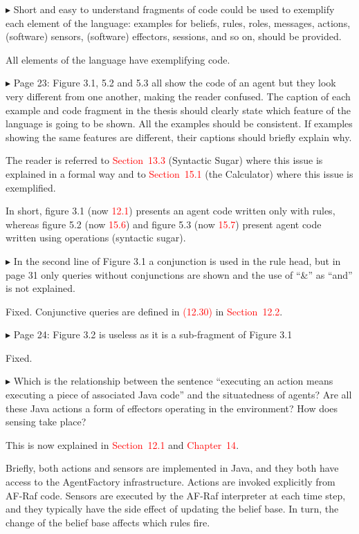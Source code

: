 \documentclass{article}
\newcommand*\R[1]{\textcolor{red}{#1}} %
\newenvironment{them}%
  {\bigskip\noindent\begingroup\color{blue}$\blacktriangleright$\enspace}%
  {\endgroup\par}
\begin{document}
\begin{them}
Short and easy to understand fragments of code could be used to exemplify each
element of the language: examples for beliefs, rules, roles, messages, actions,
(software) sensors, (software) effectors, sessions, and so on, should be
provided.
\end{them}
All elements of the language have exemplifying code. 

\begin{them}
Page 23:
Figure 3.1, 5.2 and 5.3 all show the code of an agent but they look very
different from one another, making the reader confused. The caption of each
example and code fragment in the thesis should clearly state which feature of
the language is going to be shown. All the examples should be consistent. If
examples showing the same features are different, their captions should briefly
explain why.
\end{them}
The reader is referred to \R{Section~13.3} (Syntactic Sugar) where this issue
is explained in a formal way and to \R{Section~15.1} (the Calculator) where
this issue is exemplified.

In short, figure 3.1 (now \R{12.1}) presents an agent code written only with
rules, whereas figure 5.2 (now \R{15.6}) and figure 5.3 (now \R{15.7}) present
agent code written using operations (syntactic sugar).

\begin{them}
In the second line of Figure 3.1 a conjunction is used in the rule head, but in
page 31 only queries without conjunctions are shown and the use of ``\&'' as
``and'' is not explained.
\end{them}
Fixed.
Conjunctive queries are defined in \R{(12.30)} in \R{Section~12.2}.


\begin{them}
Page 24:
Figure 3.2 is useless as it is a sub-fragment of Figure 3.1
\end{them}
Fixed. 

\begin{them}
Which is the relationship between the sentence ``executing an action means
executing a piece of associated Java code'' and the situatedness of agents? Are
all these Java actions a form of effectors operating in the environment? How
does sensing take place?
\end{them}

This is now explained in \R{Section~12.1} and \R{Chapter~14}.

Briefly, both actions and sensors are implemented in Java,
  and they both have access to the AgentFactory infrastructure.
Actions are invoked explicitly from AF-Raf code.
Sensors are executed by the AF-Raf interpreter at each time step,
  and they typically have the side effect of updating the belief base.
In turn, the change of the belief base affects
  which rules fire.
\end{document}
